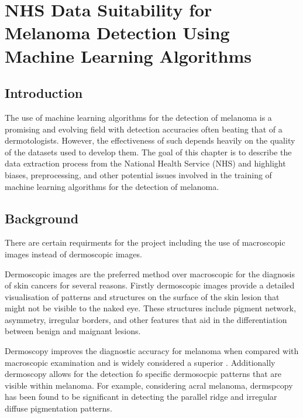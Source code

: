 \chapter{NHS Data Suitability for Melanoma Detection Using Machine Learning Algorithms}

\section{Introduction}
The use of machine learning algorithms for the detection of melanoma is a promising and evolving field with detection accuracies often beating that of a dermotologists\cite{}. However, the effectiveness of such depends heavily on the quality of the datasets used to develop them\cite{}. The goal of this chapter is to describe the data extraction process from the National Health Service (NHS) and highlight biases, preprocessing, and other potential issues involved in the training of machine learning algorithms for the detection of melanoma.

\section{Background}

There are certain requirments for the project including the use of macroscopic images instead of dermoscopic images.

Dermoscopic images are the preferred method over macroscopic for the diagnosis of skin cancers for several reasons. Firstly dermoscopic images provide a detailed visualisation of patterns and structures on the surface of the skin lesion that might not be visible to the naked eye\cite{Vestergaard et al., 2008, Oliveira, R}. These structures include pigment network, asymmetry, irregular borders, and other features that aid in the differentiation between benign and maignant lesions\cite{Vestergaard et al., 2008}. 

Dermoscopy improves the diagnostic accuracy for melanoma when compared with macroscopic examination\cite{Wolner et al., 2017} and is widely considered a superior . Additionally dermoscopy allows for the detection fo specific dermosocpic patterns that are visible within melanoma. For example, considering acral melanoma, dermspcopy has been found to be significant in detecting the parallel ridge and irregular diffuse pigmentation patterns\cite{Saida et al., 2004}. 

